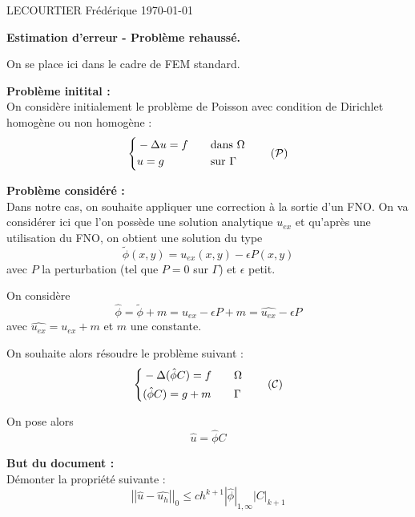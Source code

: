 \documentclass[french]{article}
\begin{document}
	LECOURTIER Frédérique \hfill \today
	\begin{center}
		\Large\textbf{{Estimation d'erreur - Problème rehaussé.}}\\
	\end{center}

	On se place ici dans le cadre de FEM standard. 
	
	\textbf{Problème initital :} \\
	On considère initialement le problème de Poisson avec condition de Dirichlet homogène ou non homogène :
	\begin{equation}
		\left\{\begin{aligned}
			&-\Delta u=f \quad &&\text{dans } \Omega \\
			&u=g \quad &&\text{sur } \Gamma
		\end{aligned}\right. \label{pb_initial} \tag{$\mathcal{P}$}
	\end{equation}

	\textbf{Problème considéré :} \\
	Dans notre cas, on souhaite appliquer une correction à la sortie d'un FNO.
	On va considérer ici que l'on possède une solution analytique $u_{ex}$ et qu'après une utilisation du FNO, on obtient une solution du type
	$$\tilde{\phi}(x,y) = u_{ex}(x,y)-\epsilon P(x,y)$$
	avec $P$ la perturbation (tel que $P=0$ sur $\Gamma$) et $\epsilon$ petit.
	
	On considère
	$$\hat{\phi}=\tilde{\phi}+m=u_{ex}-\epsilon P+m=\widehat{u_{ex}}-\epsilon P$$
	avec $\widehat{u_{ex}}=u_{ex}+m$ et $m$ une constante.
	
	On souhaite alors résoudre le problème suivant :
	\begin{equation}
		\left\{\begin{aligned}
			&-\Delta (\hat{\phi}C)=f \quad &&\Omega \\
			&(\hat{\phi}C)=g+m \quad &&\Gamma
		\end{aligned}\right. \label{pb_reh} \tag{$\mathcal{C}$}
	\end{equation}

	On pose alors
	$$\hat{u}=\hat{\phi}C$$

	\textbf{But du document :} \\
	Démonter la propriété suivante :
	\begin{equation}
		\left|\left|\hat{u}-\hat{u_h}\right|\right|_0\le ch^{k+1}|\hat{\phi}|_{1,\infty}\left|C\right|_{k+1}
		\label{ine_a_dem}
	\end{equation}
	
\end{document}
